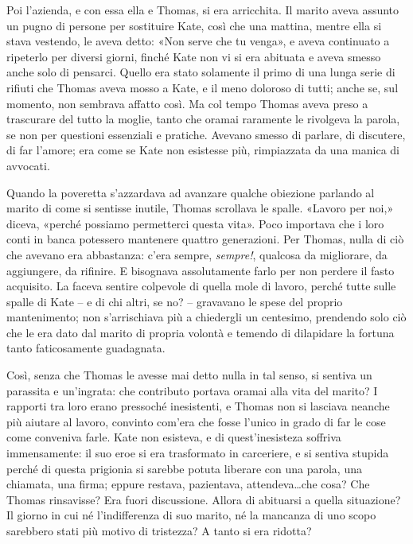 \documentclass[a4paper,oneside,11pt]{memoir}
\begin{document}
Poi l'azienda, e con essa ella e Thomas, si era arricchita. Il marito aveva
assunto un pugno di persone per sostituire Kate, così che una mattina, mentre
ella si stava vestendo, le aveva detto: «Non serve che tu venga», e aveva
continuato a ripeterlo per diversi giorni, finché Kate non vi si era abituata e
aveva smesso anche solo di pensarci. Quello era stato solamente il primo di una
lunga serie di rifiuti che Thomas aveva mosso a Kate, e il meno doloroso di
tutti; anche se, sul momento, non sembrava affatto così. Ma col tempo Thomas
aveva preso a trascurare del tutto la moglie, tanto che oramai raramente le
rivolgeva la parola, se non per questioni essenziali e pratiche. Avevano smesso
di parlare, di discutere, di far l'amore; era come se Kate non esistesse più,
rimpiazzata da una manica di avvocati.

Quando la poveretta s'azzardava ad avanzare qualche obiezione parlando al marito
di come si sentisse inutile, Thomas scrollava le spalle. «Lavoro per noi,»
diceva, «perché possiamo permetterci questa vita». Poco importava che i loro
conti in banca potessero mantenere quattro generazioni. Per Thomas, nulla di ciò
che avevano era abbastanza: c'era sempre, \emph{sempre!}, qualcosa da
migliorare, da aggiungere, da rifinire. E bisognava assolutamente farlo per non
perdere il fasto acquisito. La faceva sentire colpevole di quella mole di
lavoro, perché tutte sulle spalle di Kate -- e di chi altri, se no? -- gravavano
le spese del proprio mantenimento; non s'arrischiava più a chiedergli un
centesimo, prendendo solo ciò che le era dato dal marito di propria volontà e
temendo di dilapidare la fortuna tanto faticosamente guadagnata.

Così, senza che Thomas le avesse mai detto nulla in tal senso, si sentiva un
parassita e un'ingrata: che contributo portava oramai alla vita del marito? I
rapporti tra loro erano pressoché inesistenti, e Thomas non si lasciava neanche
più aiutare al lavoro, convinto com'era che fosse l'unico in grado di far le
cose come conveniva farle. Kate non esisteva, e di quest'inesisteza soffriva
immensamente: il suo eroe si era trasformato in carceriere, e si sentiva stupida
perché di questa prigionia si sarebbe potuta liberare con una parola, una
chiamata, una firma; eppure restava, pazientava, attendeva\dots che cosa? Che
Thomas rinsavisse? Era fuori discussione. Allora di abituarsi a quella
situazione? Il giorno in cui né l'indifferenza di suo marito, né la mancanza di
uno scopo sarebbero stati più motivo di tristezza? A tanto si era ridotta?
\end{document}
